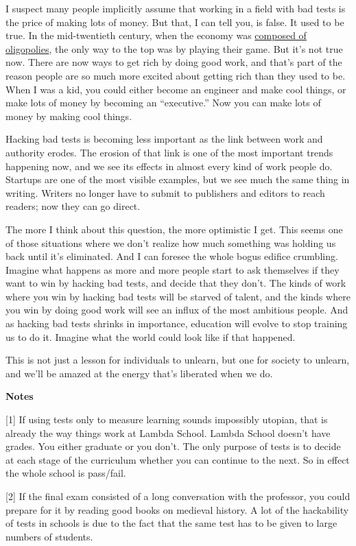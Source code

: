 I suspect many people implicitly assume that working in a field with bad
tests is the price of making lots of money. But that, I can tell you, is
false. It used to be true. In the mid-twentieth century, when the
economy was \href{re.html}{composed of oligopolies}, the only way to the
top was by playing their game. But it's not true now. There are now ways
to get rich by doing good work, and that's part of the reason people are
so much more excited about getting rich than they used to be. When I was
a kid, you could either become an engineer and make cool things, or make
lots of money by becoming an ``executive.'' Now you can make lots of
money by making cool things.

Hacking bad tests is becoming less important as the link between work
and authority erodes. The erosion of that link is one of the most
important trends happening now, and we see its effects in almost every
kind of work people do. Startups are one of the most visible examples,
but we see much the same thing in writing. Writers no longer have to
submit to publishers and editors to reach readers; now they can go
direct.

The more I think about this question, the more optimistic I get. This
seems one of those situations where we don't realize how much something
was holding us back until it's eliminated. And I can foresee the whole
bogus edifice crumbling. Imagine what happens as more and more people
start to ask themselves if they want to win by hacking bad tests, and
decide that they don't. The kinds of work where you win by hacking bad
tests will be starved of talent, and the kinds where you win by doing
good work will see an influx of the most ambitious people. And as
hacking bad tests shrinks in importance, education will evolve to stop
training us to do it. Imagine what the world could look like if that
happened.

This is not just a lesson for individuals to unlearn, but one for
society to unlearn, and we'll be amazed at the energy that's liberated
when we do.

\textbf{Notes}

{[}1{]} If using tests only to measure learning sounds impossibly
utopian, that is already the way things work at Lambda School. Lambda
School doesn't have grades. You either graduate or you don't. The only
purpose of tests is to decide at each stage of the curriculum whether
you can continue to the next. So in effect the whole school is
pass/fail.

{[}2{]} If the final exam consisted of a long conversation with the
professor, you could prepare for it by reading good books on medieval
history. A lot of the hackability of tests in schools is due to the fact
that the same test has to be given to large numbers of students.

